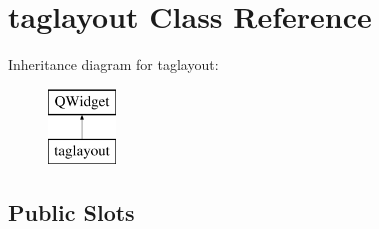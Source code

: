 \hypertarget{classtaglayout}{\section{taglayout Class Reference}
\label{classtaglayout}
}
Inheritance diagram for taglayout\-:\begin{figure}[H]
\begin{center}
\leavevmode
\includegraphics[height=2.000000cm]{classtaglayout}
\end{center}
\end{figure}
\subsection*{Public Slots}
